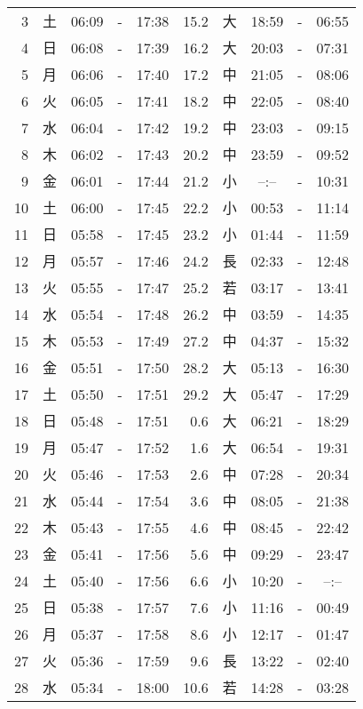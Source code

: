 \documentclass[a4j,10pt]{jsarticle}
\begin{document}
\begin{center}
\begin{table}[ht]
\begin{center}
\begin{tabular}{|rc|ccc|rc|ccc|}
  3 & 土 & 06:09 &-& 17:38 & 15.2 & 大 & 18:59 &-& 06:55 \\
  4 & 日 & 06:08 &-& 17:39 & 16.2 & 大 & 20:03 &-& 07:31 \\
  5 & 月 & 06:06 &-& 17:40 & 17.2 & 中 & 21:05 &-& 08:06 \\
  6 & 火 & 06:05 &-& 17:41 & 18.2 & 中 & 22:05 &-& 08:40 \\
  7 & 水 & 06:04 &-& 17:42 & 19.2 & 中 & 23:03 &-& 09:15 \\
  8 & 木 & 06:02 &-& 17:43 & 20.2 & 中 & 23:59 &-& 09:52 \\
  9 & 金 & 06:01 &-& 17:44 & 21.2 & 小 & --:-- &-& 10:31 \\
 10 & 土 & 06:00 &-& 17:45 & 22.2 & 小 & 00:53 &-& 11:14 \\
 11 & 日 & 05:58 &-& 17:45 & 23.2 & 小 & 01:44 &-& 11:59 \\
 12 & 月 & 05:57 &-& 17:46 & 24.2 & 長 & 02:33 &-& 12:48 \\
 13 & 火 & 05:55 &-& 17:47 & 25.2 & 若 & 03:17 &-& 13:41 \\
 14 & 水 & 05:54 &-& 17:48 & 26.2 & 中 & 03:59 &-& 14:35 \\
 15 & 木 & 05:53 &-& 17:49 & 27.2 & 中 & 04:37 &-& 15:32 \\
 16 & 金 & 05:51 &-& 17:50 & 28.2 & 大 & 05:13 &-& 16:30 \\
 17 & 土 & 05:50 &-& 17:51 & 29.2 & 大 & 05:47 &-& 17:29 \\
 18 & 日 & 05:48 &-& 17:51 &  0.6 & 大 & 06:21 &-& 18:29 \\
 19 & 月 & 05:47 &-& 17:52 &  1.6 & 大 & 06:54 &-& 19:31 \\
 20 & 火 & 05:46 &-& 17:53 &  2.6 & 中 & 07:28 &-& 20:34 \\
 21 & 水 & 05:44 &-& 17:54 &  3.6 & 中 & 08:05 &-& 21:38 \\
 22 & 木 & 05:43 &-& 17:55 &  4.6 & 中 & 08:45 &-& 22:42 \\
 23 & 金 & 05:41 &-& 17:56 &  5.6 & 中 & 09:29 &-& 23:47 \\
 24 & 土 & 05:40 &-& 17:56 &  6.6 & 小 & 10:20 &-& --:-- \\
 25 & 日 & 05:38 &-& 17:57 &  7.6 & 小 & 11:16 &-& 00:49 \\
 26 & 月 & 05:37 &-& 17:58 &  8.6 & 小 & 12:17 &-& 01:47 \\
 27 & 火 & 05:36 &-& 17:59 &  9.6 & 長 & 13:22 &-& 02:40 \\
 28 & 水 & 05:34 &-& 18:00 & 10.6 & 若 & 14:28 &-& 03:28 \\

\end{tabular}
\end{center}
\end{table}
\end{center}
\end{document}
